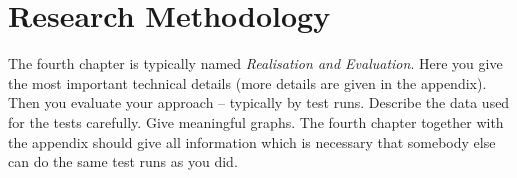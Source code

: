 \chapter{Research Methodology} \label{chapter_four}

The fourth chapter is typically named {\em Realisation and Evaluation}. Here you give the most important technical details (more details are given in the appendix). Then you evaluate your approach -- typically by test runs. Describe the data used for the tests carefully. Give meaningful graphs. The fourth chapter together with the appendix should give all information which is necessary that somebody else can do the same test runs as you did.